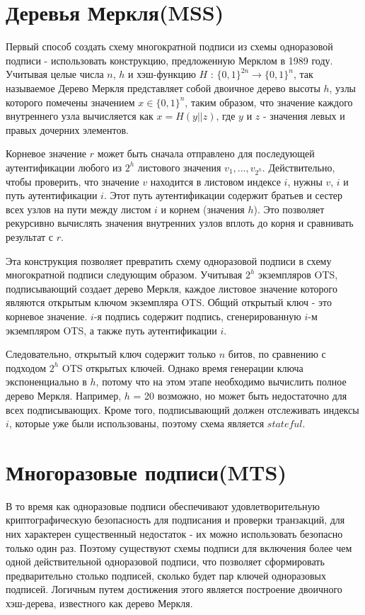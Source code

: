 \documentclass[a4paper, 14pt]{extarticle}
\begin{document}
\section{Деревья Меркля(MSS)}
Первый способ создать схему многократной подписи из схемы одноразовой подписи - использовать конструкцию, предложенную Мерклом в 1989 году. Учитывая целые числа $n$, $h$ и хэш-функцию $H$ : $\{0, 1\}^{2n} \rightarrow \{0, 1\}^{n}$, так называемое Дерево Меркля представляет собой двоичное дерево высоты $h$, узлы которого помечены значением $x \in \{0, 1\}^{n}$, таким образом, что значение каждого внутреннего узла вычисляется как $x = H(y||z)$, где $y$ и $z$ - значения левых и правых дочерних элементов.

Корневое значение $r$ может быть сначала отправлено для последующей аутентификации любого из $2^{h}$ листового значения $v_{1}, ..., v_{2^h}$. Действительно, чтобы проверить, что значение $v$ находится в листовом индексе $i$, нужны $v$, $i$ и путь аутентификации $i$. Этот путь аутентификации содержит братьев и сестер всех узлов на пути между листом $i$ и корнем (значения $h$). Это позволяет рекурсивно вычислять значения внутренних узлов вплоть до корня и сравнивать результат с $r$.

Эта конструкция позволяет превратить схему одноразовой подписи в схему многократной подписи следующим образом. Учитывая $2^h$ экземпляров OTS, подписывающий создает дерево Меркля, каждое листовое значение которого являются открытым ключом экземпляра OTS. Общий открытый ключ - это корневое значение. $i$-я подпись содержит подпись, сгенерированную $i$-м экземпляром OTS, а также путь аутентификации $i$.

Следовательно, открытый ключ содержит только $n$ битов, по сравнению с подходом $2^h$ OTS открытых ключей. Однако время генерации ключа экспоненциально в $h$, потому что на этом этапе необходимо вычислить полное дерево Меркля. Например, $h$ = 20 возможно, но может быть недостаточно для всех подписывающих. Кроме того, подписывающий должен отслеживать индексы $i$, которые уже были использованы, поэтому схема является $stateful$.
\newpage

\section{Многоразовые подписи(MTS)}
В то время как одноразовые подписи обеспечивают удовлетворительную криптографическую безопасность для подписания и проверки транзакций, для них характерен существенный недостаток - их можно использовать безопасно только один раз. Поэтому существуют схемы подписи для включения более чем одной действительной одноразовой подписи, что позволяет сформировать предварительно столько подписей, сколько будет пар ключей одноразовых подписей. Логичным путем достижения этого является построение двоичного хэш-дерева, известного как дерево Меркля.
\end{document}

